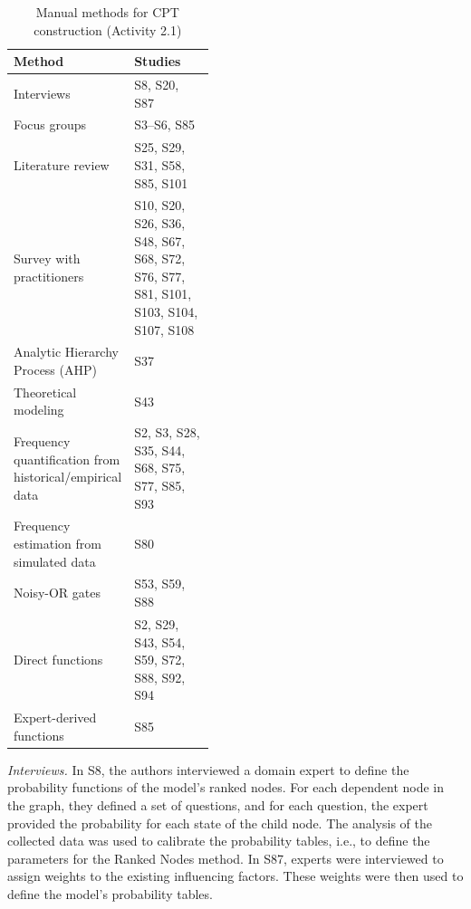 \begin{table}[t]
\caption{Manual methods for CPT construction (Activity 2.1)}
\label{tab:metodos_manuais_cpt}
\centering
\small
\setlength{\tabcolsep}{6pt}
\renewcommand{\arraystretch}{1.2}

\begin{tabularx}{\linewidth}{>{\raggedright\arraybackslash}p{0.44\linewidth}
                              >{\raggedright\arraybackslash}X}
\toprule
\textbf{Method} & \textbf{Studies} \\
\midrule
Interviews
& S8, S20, S87 \\
Focus groups
& S3--S6, S85 \\
Literature review
& S25, S29, S31, S58, S85, S101 \\
Survey with practitioners
& S10, S20, S26, S36, S48, S67, S68, S72, S76, S77, S81, S101, S103, S104, S107, S108 \\
Analytic Hierarchy Process (AHP)
& S37 \\
Theoretical modeling
& S43 \\
Frequency quantification from historical/empirical data
& S2, S3, S28, S35, S44, S68, S75, S77, S85, S93 \\
Frequency estimation from simulated data
& S80 \\
Noisy-OR gates
& S53, S59, S88 \\
Direct functions
& S2, S29, S43, S54, S59, S72, S88, S92, S94 \\
Expert-derived functions
& S85 \\
\bottomrule
\end{tabularx}
\end{table}

\textit{Interviews.} In S8, the authors interviewed a domain expert to define the probability functions of the model's ranked nodes. For each dependent node in the graph, they defined a set of questions, and for each question, the expert provided the probability for each state of the child node. The analysis of the collected data was used to calibrate the probability tables, i.e., to define the parameters for the Ranked Nodes method. In S87, experts were interviewed to assign weights to the existing influencing factors. These weights were then used to define the model's probability tables.

